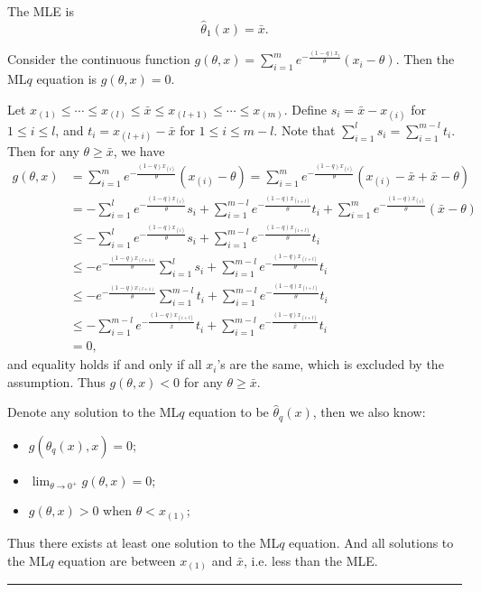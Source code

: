 \documentclass[a4paper]{article}
\newenvironment{proof}{{\bf Proof:  }}{\hfill\rule{2mm}{2mm}}
\begin{document}
\begin{proof}
The MLE is
\[
	\hat{\theta}_1(x) = \bar{x}.
\]

Consider the continuous function $g(\theta, x) = \sum_{i=1}^m e^{-\frac{(1-q)x_i}{\theta}}(x_i - \theta)$. Then the ML$q$ equation is $g(\theta, x) = 0$.

Let $x_{(1)} \le \cdots \le x_{(l)} \le \bar{x} \le x_{(l+1)} \le \cdots \le x_{(m)}$. Define $s_i = \bar{x} - x_{(i)}$ for $1 \le i \le l$, and $t_{i} = x_{(l+i)} - \bar{x}$ for $1 \le i \le m - l$. Note that $\sum_{i=1}^l s_i = \sum_{i=1}^{m-l} t_i$. Then for any $\theta \ge \bar{x}$, we have
\begin{align*}
g(\theta, x) & = \sum_{i=1}^m e^{-\frac{(1-q)x_{(i)}}{\theta}}(x_{(i)} - \theta)
= \sum_{i=1}^m e^{-\frac{(1-q)x_{(i)}}{\theta}}(x_{(i)} - \bar{x} + \bar{x} - \theta) \\
& = - \sum_{i=1}^l e^{-\frac{(1-q)x_{(i)}}{\theta}}s_i
+ \sum_{i=1}^{m-l} e^{-\frac{(1-q)x_{(i+l)}}{\theta}}t_i
+ \sum_{i=1}^m e^{-\frac{(1-q)x_{(i)}}{\theta}}(\bar{x} - \theta)\\
& \le - \sum_{i=1}^l e^{-\frac{(1-q)x_{(i)}}{\theta}}s_i
+ \sum_{i=1}^{m-l} e^{-\frac{(1-q)x_{(i+l)}}{\theta}}t_i \\
& \le - e^{-\frac{(1-q)x_{(l+1)}}{\theta}} \sum_{i=1}^l s_i
+ \sum_{i=1}^{m-l} e^{-\frac{(1-q)x_{(i+l)}}{\theta}}t_i \\
& \le - e^{-\frac{(1-q)x_{(l+1)}}{\theta}} \sum_{i=1}^{m-l} t_i
+ \sum_{i=1}^{m-l} e^{-\frac{(1-q)x_{(i+l)}}{\theta}}t_i \\
& \le - \sum_{i=1}^{m-l} e^{-\frac{(1-q)x_{(i+l)}}{\bar{x}}}t_i
+ \sum_{i=1}^{m-l} e^{-\frac{(1-q)x_{(i+l)}}{\bar{x}}}t_i\\
& = 0,
\end{align*}
and equality holds if and only if all $x_i$'s are the same, which is excluded by the assumption.
Thus $g(\theta, x) < 0$ for any $\theta \ge \bar{x}$.

Denote any solution to the ML$q$ equation to be $\hat{\theta}_q(x)$, then we also know:
\begin{itemize}
\item $g(\hat{\theta}_q(x), x) = 0$;
\item $\lim_{\theta \rightarrow 0^+}g(\theta, x) = 0$;
\item $g(\theta, x) > 0$ when $\theta < x_{(1)}$;
\end{itemize}

Thus there exists at least one solution to the ML$q$ equation. And all solutions to the ML$q$ equation are between $x_{(1)}$ and $\bar{x}$, i.e. less than the MLE.
\end{proof}
\end{document}
